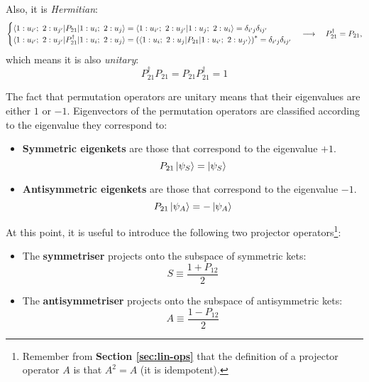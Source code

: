 Also, it is \textit{Hermitian}:
\begin{equation}
    \begin{cases}
        \braket{1:u_{i'};\ 2:u_{j'}| P_{21} | 1:u_i ;\ 2: u_j} = \braket{1:u_{i'};\ 2:u_{j'}| 1:u_j ;\ 2: u_i} = \delta_{i'j}\delta_{ij'}\\ 
        \braket{1:u_{i'};\ 2:u_{j'}| P_{21}^\dagger | 1:u_i ;\ 2: u_j} = \left(\braket{1:u_i ;\ 2: u_j| P_{21} | 1:u_{i'};\ 2:u_{j'}}\right)^* = \delta_{i'j}\delta_{ij'}\\ 
    \end{cases} \longrightarrow\quad  P_{21}^\dagger = P_{21},
\end{equation}
which means it is also \textit{unitary}:
\begin{equation}
    P_{21}^\dagger P_{21} = P_{21}P_{21}^\dagger = 1
\end{equation}

The fact that permutation operators are unitary means that their eigenvalues are either $1$ or $-1$. Eigenvectors of the permutation operators are classified according to the eigenvalue they correspond to:
\begin{itemize}
    \item \textbf{Symmetric eigenkets} are those that correspond to the eigenvalue $+1$.
    \begin{equation}
        P_{21}\ket{\psi_S} = \ket{\psi_S}
    \end{equation}
    \item \textbf{Antisymmetric eigenkets} are those that correspond to the eigenvalue $-1$.
    \begin{equation}
        P_{21}\ket{\psi_A} = -\ket{\psi_A}
    \end{equation}
\end{itemize}

At this point, it is useful to introduce the following two projector operators\footnote{Remember from \textbf{Section \ref{sec:lin-ops}} that the definition of a projector operator $A$ is that $A^2 = A$ (it is idempotent).}:
\begin{itemize}
    \item The \textbf{symmetriser} projects onto the subspace of symmetric  kets:
    \begin{equation}
        S\equiv \frac{1 + P_{12}}{2}
    \end{equation}
    \item The \textbf{antisymmetriser} projects onto the subspace of antisymmetric  kets:
    \begin{equation}
        A\equiv\frac{1-P_{12}}{2}
    \end{equation}
\end{itemize}

